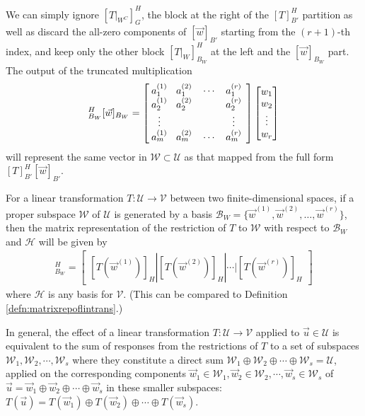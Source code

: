 We can simply ignore $[T|_{W^C}]_G^H$, the block at the right of the $[T]_{B'}^H$ partition as well as discard the all-zero components of $[\vec{w}]_{B'}$ starting from the $(r+1)$-th index, and keep only the other block $[T|_{W}]_{B_W}^H$ at the left and the $[\vec{w}]_{B_W}$ part. The output of the truncated multiplication
\begin{align*}
[T|_{W}]_{B_W}^H [\vec{w}]_{B_W} = 
\left[\begin{array}{@{\;}wc{15pt}wc{15pt}wc{15pt}wc{15pt}}
a_1^{(1)} & a_1^{(2)} & \cdots & a_1^{(r)} \\
a_2^{(1)} & a_2^{(2)} & & a_2^{(r)} \\
\vdots & & & \vdots \\
a_m^{(1)} & a_m^{(2)} & \cdots & a_m^{(r)} 
\end{array}\right]
\begin{bmatrix}
w_1 \\
w_2 \\
\vdots \\
w_r \\
\end{bmatrix}
\end{align*}
will represent the same vector in $\mathcal{W} \subset \mathcal{U}$ as that mapped from the full form $[T]_{B'}^H[\vec{w}]_{B'}$.
\begin{proper}
\label{proper:restrictmat}
For a linear transformation $T: \mathcal{U} \to \mathcal{V}$ between two finite-dimensional spaces, if a proper subspace $\mathcal{W}$ of $\mathcal{U}$ is generated by a basis $\mathcal{B}_W = \{\vec{w}^{(1)}, \vec{w}^{(2)}, \ldots, \vec{w}^{(r)}\}$, then the matrix representation of the restriction of $T$ to $\mathcal{W}$ with respect to $\mathcal{B}_W$ and $\mathcal{H}$ will be given by
\begin{align*}
[T|_{W}]_{B_W}^H = \begin{bmatrix}
[T(\vec{w}^{(1)})]_H | [T(\vec{w}^{(2)})]_H | \cdots | [T(\vec{w}^{(r)})]_H
\end{bmatrix}    
\end{align*}
where $\mathcal{H}$ is any basis for $\mathcal{V}$. (This can be compared to Definition \ref{defn:matrixrepoflintrans}.)
\end{proper}
In general, the effect of a linear transformation $T: \mathcal{U} \to \mathcal{V}$ applied to $\vec{u} \in \mathcal{U}$ is equivalent to the sum of responses from the restrictions of $T$ to a set of subspaces $\mathcal{W}_1, \mathcal{W}_2, \cdots, \mathcal{W}_s$ where they constitute a direct sum $\mathcal{W}_1 \oplus \mathcal{W}_2 \oplus \cdots \oplus \mathcal{W}_s = \mathcal{U}$, applied on the corresponding components $\vec{w}_1 \in \mathcal{W}_1, \vec{w}_2 \in \mathcal{W}_2, \cdots, \vec{w}_s \in \mathcal{W}_s$ of $\vec{u} = \vec{w}_1 \oplus \vec{w}_2 \oplus \cdots \oplus \vec{w}_s$ in these smaller subspaces: $T(\vec{u}) = T(\vec{w}_1) \oplus T(\vec{w}_2) \oplus \cdots \oplus T(\vec{w}_s)$.
